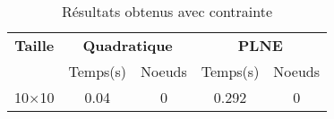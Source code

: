 \documentclass[main.tex]{subfiles}
\begin{document}
\thispagestyle{empty}

\begin{table}[h]
    \centering
    \begin{tabular}{ccccc}
	\hline	
	\textbf{Taille} &\multicolumn{2}{c}{\textbf{Quadratique}} &\multicolumn{2}{c}{\textbf{PLNE}}\\
	 &Temps(s) &Noeuds &Temps(s) &Noeuds\\

\hline
	10$\times$10 &0.04 &0 &0.292 &0\\
\end{tabular}\caption{Résultats obtenus avec contrainte}
\end{table}
\end{document}
